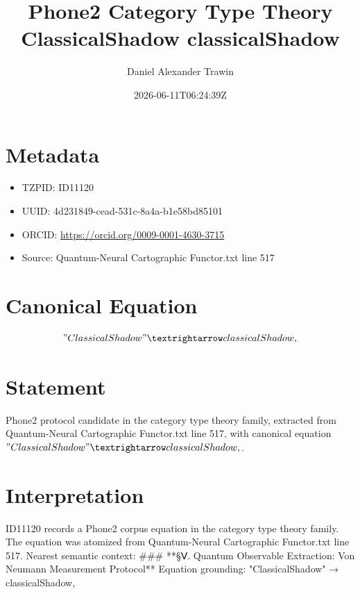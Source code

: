 \documentclass[11pt]{article}
\title{Phone2 Category Type Theory ClassicalShadow classicalShadow}
\author{Daniel Alexander Trawin}
\date{2026-06-11T06:24:39Z}
\begin{document}
\maketitle
\section*{Metadata}
\begin{itemize}
\item TZPID: ID11120
\item UUID: 4d231849-cead-531c-8a4a-b1e58bd85101
\item ORCID: \url{https://orcid.org/0009-0001-4630-3715}
\item Source: Quantum-Neural Cartographic Functor.txt line 517
\end{itemize}
\section*{Canonical Equation}
\[
"ClassicalShadow" → classicalShadow,
\]
\section*{Statement}
Phone2 protocol candidate in the category type theory family, extracted from Quantum-Neural Cartographic Functor.txt line 517, with canonical equation $"ClassicalShadow" → classicalShadow,$.
\section*{Interpretation}
ID11120 records a Phone2 corpus equation in the category type theory family. The equation was atomized from Quantum-Neural Cartographic Functor.txt line 517. Nearest semantic context: ### **§Ⅴ. Quantum Observable Extraction: Von Neumann Measurement Protocol** Equation grounding: "ClassicalShadow" → classicalShadow,
\end{document}
